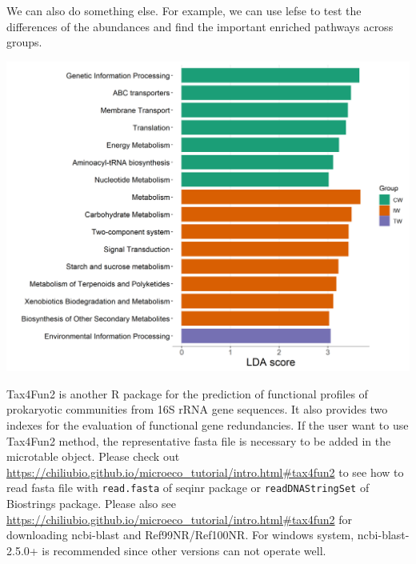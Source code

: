 \documentclass[
]{book}
\newenvironment{Shaded}{\begin{snugshade}}{\end{snugshade}}
\newcommand{\AttributeTok}[1]{\textcolor[rgb]{0.77,0.63,0.00}{#1}}
\newcommand{\ConstantTok}[1]{\textcolor[rgb]{0.00,0.00,0.00}{#1}}
\newcommand{\DecValTok}[1]{\textcolor[rgb]{0.00,0.00,0.81}{#1}}
\newcommand{\FloatTok}[1]{\textcolor[rgb]{0.00,0.00,0.81}{#1}}
\newcommand{\FunctionTok}[1]{\textcolor[rgb]{0.00,0.00,0.00}{#1}}
\newcommand{\NormalTok}[1]{#1}
\newcommand{\OtherTok}[1]{\textcolor[rgb]{0.56,0.35,0.01}{#1}}
\newcommand{\SpecialCharTok}[1]{\textcolor[rgb]{0.00,0.00,0.00}{#1}}
\newcommand{\StringTok}[1]{\textcolor[rgb]{0.31,0.60,0.02}{#1}}
\begin{document}
We can also do something else. For example, we can use lefse to test the differences of the abundances and find the important enriched pathways across groups.

\begin{Shaded}
\end{Shaded}

\begin{center}\includegraphics[width=600px]{Images/plot_lefse_bar_tax4fun} \end{center}

Tax4Fun2 \citep{Wemheuer_Tax4Fun2_2020} is another R package for the prediction of functional profiles of prokaryotic communities from 16S rRNA gene sequences.
It also provides two indexes for the evaluation of functional gene redundancies.
If the user want to use Tax4Fun2 method, the representative fasta file is necessary to be added in the microtable object.
Please check out \url{https://chiliubio.github.io/microeco_tutorial/intro.html\#tax4fun2} to see
how to read fasta file with \texttt{read.fasta} of seqinr package or \texttt{readDNAStringSet} of Biostrings package.
Please also see \url{https://chiliubio.github.io/microeco_tutorial/intro.html\#tax4fun2} for downloading ncbi-blast and Ref99NR/Ref100NR.
For windows system, ncbi-blast-2.5.0+ is recommended since other versions can not operate well.
\end{document}

